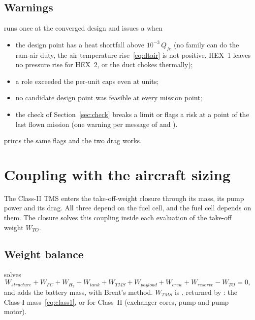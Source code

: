 \documentclass[a4paper,11pt]{article}
\newcommand{\Qfc}{Q_{fc}}
\begin{document}
\subsection{Warnings}\label{sec:warnings}
 runs once at the converged design and issues a
 when
\begin{itemize}
\item the design point has a heat shortfall above $10^{-3}\,\Qfc$ (no family can do the
  ram-air duty, the air temperature rise~\eqref{eq:dtair} is not positive, HEX~1 leaves no
  pressure rise for HEX~2, or the duct chokes thermally);
\item a role exceeded the per-unit caps even at  units;
\item no candidate design point was feasible at every mission point;
\item the check of Section~\ref{sec:check} breaks a limit or flags a risk at a point of
  the last flown mission (one warning per message of  and
  ).
\end{itemize}
 prints the same flags and the two drag works.

\section{Coupling with the aircraft sizing}\label{sec:coupling}

The Class-II TMS enters the take-off-weight closure through its mass, its pump power and its
drag. All three depend on the fuel cell, and the fuel cell depends on them. The closure
solves this coupling inside each evaluation of the take-off weight $W_{TO}$.

\subsection{Weight balance}
 solves
\begin{equation}
  W_{structure} + W_{FC} + W_{H_2} + W_{tank} + W_{TMS} + W_{payload} + W_{crew} + W_{reserve} - W_{TO} = 0,
\end{equation}
and  adds the battery mass, with Brent's method. $W_{TMS}$ is
, returned by : the Class-I
mass~\eqref{eq:class1}, or  for Class~II (exchanger cores, pump
and pump motor).
\end{document}
